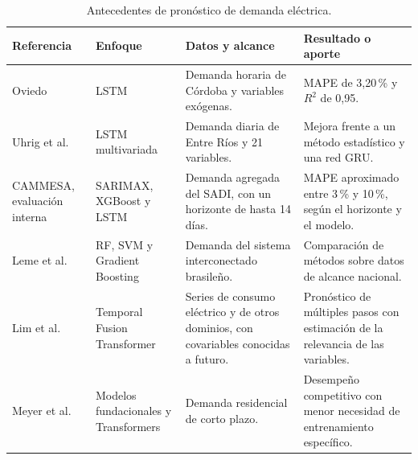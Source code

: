 \begin{table}[H]
	\centering
	\caption{Antecedentes de pronóstico de demanda eléctrica.}
	\label{tab:estado_arte}
	\footnotesize
	\setlength{\tabcolsep}{3pt}
	\setlength{\defaultaddspace}{2pt}
	\renewcommand{\arraystretch}{1.10}
	
	\begin{tabularx}{\textwidth}{
		@{}
		>{\raggedright\arraybackslash\hsize=0.70\hsize}X
		>{\raggedright\arraybackslash\hsize=0.80\hsize}X
		>{\raggedright\arraybackslash\hsize=1.20\hsize}X
		>{\raggedright\arraybackslash\hsize=1.30\hsize}X
		@{}
	}

		\toprule
		
		\textbf{Referencia} &
		\textbf{Enfoque} &
		\textbf{Datos y alcance} &
		\textbf{Resultado o aporte} \\
		
		\midrule
		
		Oviedo \cite{oviedo2025regional} &
		LSTM &
		Demanda horaria de Córdoba y variables exógenas. &
		MAPE de 3,20\,\% y $R^2$ de 0,95. \\ \addlinespace
		
		Uhrig et al. \cite{uhrig2026multivariate} &
		LSTM multivariada &
		Demanda diaria de Entre Ríos y 21 variables. &
		Mejora frente a un método estadístico y una red GRU. \\ \addlinespace
		
		CAMMESA, evaluación interna &
		SARIMAX, XGBoost y LSTM &
		Demanda agregada del SADI, con un horizonte de hasta 14 días. &
		MAPE aproximado entre 3\,\% y 10\,\%, según el horizonte y el modelo. \\ \addlinespace
		
		Leme et al. \cite{leme2020brazil} &
		RF, SVM y Gradient Boosting &
		Demanda del sistema interconectado brasileño. &
		Comparación de métodos sobre datos de alcance nacional. \\ \addlinespace
		
		Lim et al. \cite{lim2021tft} &
		Temporal Fusion Transformer &
		Series de consumo eléctrico y de otros dominios, con covariables conocidas a futuro. &
		Pronóstico de múltiples pasos con estimación de la relevancia de las variables. \\ \addlinespace
		
		Meyer et al. \cite{meyer2025foundationload} &
		Modelos fundacionales y Transformers &
		Demanda residencial de corto plazo. &
		Desempeño competitivo con menor necesidad de entrenamiento específico. \\
		
		\bottomrule
	\end{tabularx}
\end{table}


